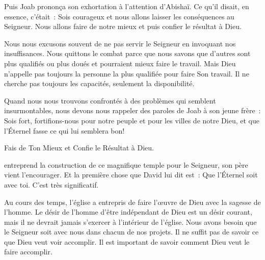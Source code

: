 Puis Joab prononça son exhortation à l'attention d'Abishaï.
 Ce qu'il disait, en essence, c'était~:
 \og Sois courageux et nous allons laisser les conséquences au Seigneur.
 Nous allons faire de notre mieux et puis confier le résultat à Dieu. \fg{}


Nous nous excusons souvent de ne pas servir le Seigneur
 en invoquant nos insuffisances. Nous quittons le combat parce que nous savons
 que d'autres sont plus qualifiés ou plus doués
 et pourraient mieux faire le travail.
 Mais Dieu n'appelle pas toujours la personne la plus qualifiée
 pour faire Son travail. Il ne cherche pas toujours les capacités,
 seulement la disponibilité. 

Quand nous nous trouvons confrontés à des problèmes
 qui semblent insurmontables, nous devons nous rappeler des paroles de Joab
 à son jeune frère~:
 \og Sois fort, fortifions-nous pour notre peuple
 et pour les villes de notre Dieu,
 et que l'Éternel fasse ce qui lui semblera bon! \fg{}

Fais de Ton Mieux et Confie le Résultat à Dieu. 

\dvrule






 entreprend la construction
 de ce magnifique temple pour le Seigneur, son père vient l'encourager.
 Et la première chose que David lui dit est~:
 \og Que l'Éternel soit avec toi. \fg{} C'est très significatif. 

Au cours des temps, l'église a entrepris de faire l'\oe{}uvre de Dieu
 avec la sagesse de l'homme. Le désir de l'homme d'être indépendant de Dieu
 est un désir courant, mais il ne devrait jamais s'exercer
 à l'intérieur de l'église.
 Nous avons besoin que le Seigneur soit avec nous dans chacun de nos projets.
 Il ne suffit pas de savoir ce que Dieu veut voir accomplir.
 Il est important de savoir comment Dieu veut le faire accomplir. 

